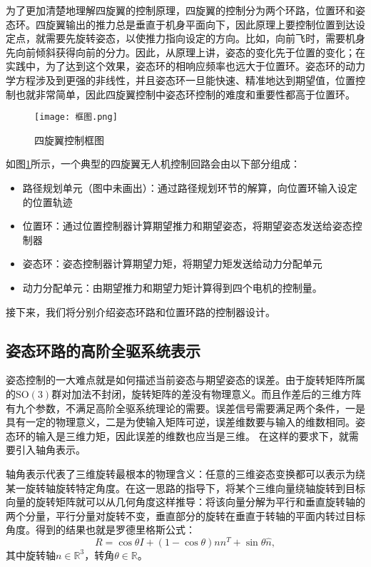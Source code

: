 为了更加清楚地理解四旋翼的控制原理，四旋翼的控制分为两个环路，位置环和姿态环。四旋翼输出的推力总是垂直于机身平面向下，因此原理上要控制位置到达设定点，就需要先旋转姿态，以使推力指向设定的方向。比如，向前飞时，需要机身先向前倾斜获得向前的分力。因此，从原理上讲，姿态的变化先于位置的变化；在实践中，为了达到这个效果，姿态环的相响应频率也远大于位置环。姿态环的动力学方程涉及到更强的非线性，并且姿态环一旦能快速、精准地达到期望值，位置控制也就非常简单，因此四旋翼控制中姿态环控制的难度和重要性都高于位置环。

\begin{figure}[!h]
    \centering
    \texttt{[image: 框图.png]}
    \caption{四旋翼控制框图}
    \label{框图}
  \end{figure}
如图\ref{框图}所示，一个典型的四旋翼无人机控制回路会由以下部分组成\cite{survey}：
\begin{itemize}
     \item 路径规划单元（图中未画出）：通过路径规划环节的解算，向位置环输入设定的位置轨迹
     \item 位置环：通过位置控制器计算期望推力和期望姿态，将期望姿态发送给姿态控制器
     \item 姿态环：姿态控制器计算期望力矩，将期望力矩发送给动力分配单元
     \item 动力分配单元：由期望推力和期望力矩计算得到四个电机的控制量。
   \end{itemize}

   接下来，我们将分别介绍姿态环路和位置环路的控制器设计。
\subsection*{姿态环路的高阶全驱系统表示}
姿态控制的一大难点就是如何描述当前姿态与期望姿态的误差。由于旋转矩阵所属的$\text{SO}(3)$群对加法不封闭，旋转矩阵的差没有物理意义。而且作差后的三维方阵有九个参数，不满足高阶全驱系统理论的需要。误差信号需要满足两个条件，一是具有一定的物理意义，二是为使输入矩阵可逆，误差维数要与输入的维数相同。姿态环的输入是三维力矩，因此误差的维数也应当是三维。
在这样的要求下，就需要引入轴角表示。

轴角表示代表了三维旋转最根本的物理含义：任意的三维姿态变换都可以表示为绕某一旋转轴旋转特定角度。在这一思路的指导下，将某个三维向量绕轴旋转到目标向量的旋转矩阵就可以从几何角度这样推导：将该向量分解为平行和垂直旋转轴的两个分量，平行分量对旋转不变，垂直部分的旋转在垂直于转轴的平面内转过目标角度。得到的结果也就是罗德里格斯公式\cite{Rodrigues1840}：
\begin{equation}
  R=\cos \theta I+(1- \cos \theta)nn^T+\sin\theta \widehat n,
  \label{equ:Rodrigue}
\end{equation}
其中旋转轴$n \in \mathbb{R}^{3}$，转角$\theta \in \mathbb{R}$。

